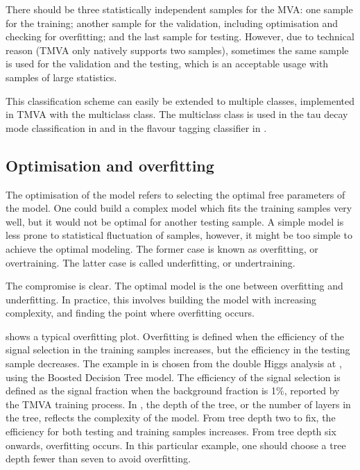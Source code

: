 
There should be three statistically independent samples for the MVA: one sample for the training; another sample for the validation, including optimisation and checking for overfitting; and the last sample for testing. However, due to technical reason (TMVA only natively supports two samples), sometimes the same sample is used for the validation and the testing, which is an acceptable usage with samples of large statistics.

This classification scheme can easily be extended to multiple classes, implemented in TMVA with the multiclass class. The multiclass class is used in the tau decay mode classification in  and in the flavour tagging classifier in .

\subsection{Optimisation and overfitting}
\label{sec:pandoraMVAoptimisation}

The optimisation of the model refers to selecting the optimal free parameters of the model. One could build a complex model which fits the training samples very well, but it would not be optimal for another testing sample. A simple model is less prone to statistical fluctuation of samples, however, it might be too simple to achieve the optimal modeling. The former case is known as overfitting, or overtraining. The latter case is called underfitting, or undertraining.

The compromise is clear. The optimal model is the one between overfitting and underfitting. In practice, this involves building the model with increasing complexity, and finding the point where overfitting occurs.


 shows a typical overfitting plot. Overfitting is defined when the efficiency of the signal selection in the training samples increases, but the efficiency in the testing sample decreases. The example in   is chosen from the double Higgs analysis at , using the Boosted Decision Tree model. The efficiency of the signal selection is defined as the signal fraction when the background fraction is 1\%, reported by the TMVA training process. In  , the depth of the tree, or the number of layers in the tree, reflects the complexity of the model. From tree depth two to fix, the efficiency for both testing and training samples increases. From tree depth six onwards, overfitting occurs. In this particular example, one should choose a tree depth fewer than seven to avoid overfitting.

